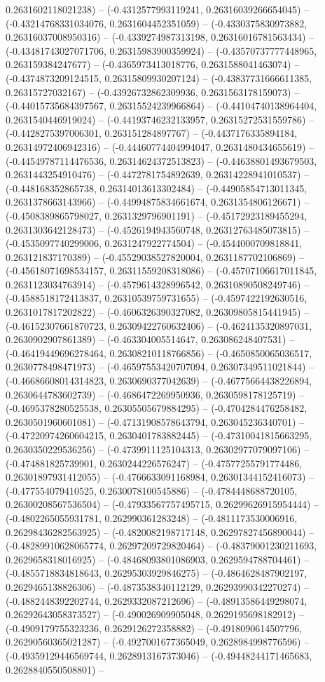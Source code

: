 0.2631602118021238) -- (-0.4312577993119241, 0.26316039266654045) -- (-0.43214768331034076, 0.2631604452351059) -- (-0.4330375830973882, 0.26316037008950316) -- (-0.4339274987313198, 0.26316016781563434) -- (-0.43481743027071706, 0.26315983900359924) -- (-0.43570737777448965, 0.263159384247677) -- (-0.4365973413018776, 0.2631588041463074) -- (-0.4374873209124515, 0.26315809930207124) -- (-0.43837731666611385, 0.26315727032167) -- (-0.43926732862309936, 0.2631563178159073) -- (-0.44015735684397567, 0.26315524239966864) -- (-0.44104740138964404, 0.2631540446919024) -- (-0.44193746232133957, 0.26315272531559786) -- (-0.4428275397006301, 0.263151284897767) -- (-0.4437176335894184, 0.26314972406942316) -- (-0.44460774404994047, 0.2631480434655619) -- (-0.44549787114476536, 0.26314624372513823) -- (-0.44638801493679503, 0.2631443254910476) -- (-0.4472781754892639, 0.26314228941010537) -- (-0.448168352865738, 0.26314013613302484) -- (-0.44905854713011345, 0.2631378663143966) -- (-0.44994875834661674, 0.2631354806126671) -- (-0.4508389865798027, 0.2631329796901191) -- (-0.45172923189455294, 0.2631303642128473) -- (-0.4526194943560748, 0.26312763485073815) -- (-0.4535097740299006, 0.2631247922774504) -- (-0.4544000709818841, 0.263121837170389) -- (-0.45529038527820004, 0.2631187702106869) -- (-0.45618071698534157, 0.26311559208318086) -- (-0.45707106617011845, 0.2631123034763914) -- (-0.4579614328996542, 0.26310890508249746) -- (-0.4588518172413837, 0.26310539759731655) -- (-0.4597422192630516, 0.2631017817202822) -- (-0.4606326390327082, 0.26309805815441945) -- (-0.46152307661870723, 0.26309422760632406) -- (-0.4624135320897031, 0.2630902907861389) -- (-0.463304005514647, 0.263086248407531) -- (-0.46419449696278464, 0.26308210118766856) -- (-0.4650850065036517, 0.2630778498471973) -- (-0.46597553420707094, 0.26307349511021844) -- (-0.46686608014314823, 0.2630690377042639) -- (-0.46775664438226894, 0.2630644783602739) -- (-0.4686472269950936, 0.2630598178125719) -- (-0.4695378280525538, 0.26305505679884295) -- (-0.4704284476258482, 0.2630501960601081) -- (-0.47131908578643794, 0.263045236340701) -- (-0.47220974260604215, 0.2630401783882445) -- (-0.47310041815663295, 0.2630350229536256) -- (-0.4739911125104313, 0.26302977079097106) -- (-0.474881825739901, 0.2630244226576247) -- (-0.47577255791774486, 0.26301897931412055) -- (-0.4766633091168984, 0.26301344152416073) -- (-0.477554079410525, 0.2630078100545886) -- (-0.4784448688720105, 0.26300208567536504) -- (-0.47933567757495715, 0.26299626915954444) -- (-0.4802265055931781, 0.262990361283248) -- (-0.4811173530006916, 0.26298436282563925) -- (-0.4820082198717148, 0.26297827456890044) -- (-0.48289910628065774, 0.26297209729820464) -- (-0.48379001230211693, 0.2629658318016925) -- (-0.48468093801086903, 0.2629594788704461) -- (-0.4855718834818643, 0.26295303929846275) -- (-0.4864628487902197, 0.2629465138826306) -- (-0.4873538340112129, 0.26293990342270274) -- (-0.4882448392202744, 0.2629332087212696) -- (-0.48913586449298074, 0.26292643058373527) -- (-0.490026909905048, 0.2629195698182912) -- (-0.4909179755323236, 0.2629126272358882) -- (-0.4918090614507796, 0.26290560365021287) -- (-0.4927001677365049, 0.2628984998776596) -- (-0.49359129446569744, 0.2628913167373046) -- (-0.49448244171465683, 0.2628840550508801) -- 